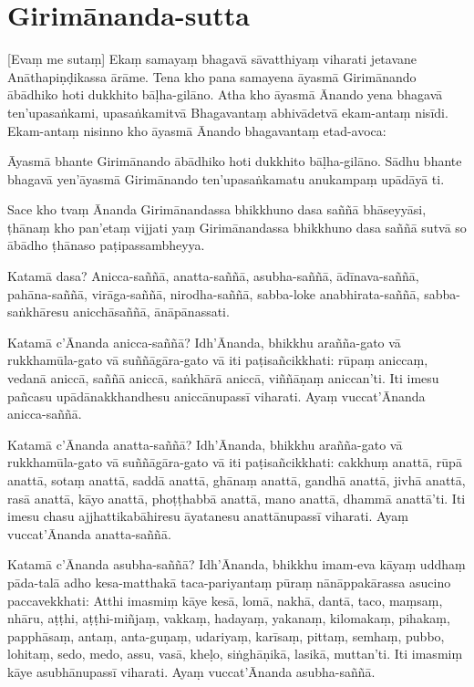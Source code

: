 \section{Girimānanda-sutta}

[Evaṃ me sutaṃ] 
Ekaṃ samayaṃ bhagavā sāvatthiyaṃ viharati jetavane
Anāthapiṇḍikassa ārāme. Tena kho pana samayena āyasmā Girimānando ābādhiko hoti
dukkhito bāḷha-gilāno. Atha kho āyasmā Ānando yena bhagavā ten’upasaṅkami,
upasaṅkamitvā Bhagavantaṃ abhivādetvā ekam-antaṃ nisīdi. Ekam-antaṃ nisinno kho
āyasmā Ānando bhagavantaṃ etad-avoca:

Āyasmā bhante Girimānando ābādhiko hoti dukkhito bāḷha-gilāno. Sādhu bhante
bhagavā yen’āyasmā Girimānando ten’upasaṅkamatu anukampaṃ upādāyā ti.

Sace kho tvaṃ Ānanda Girimānandassa bhikkhuno dasa saññā bhāseyyāsi, ṭhānaṃ kho
pan’etaṃ vijjati yaṃ Girimānandassa bhikkhuno dasa saññā sutvā so ābādho ṭhānaso
paṭipassambheyya.

Katamā dasa? Anicca-saññā, anatta-saññā, asubha-saññā, ādīnava-saññā,
pahāna-saññā, virāga-saññā, nirodha-saññā, sabba-loke anabhirata-saññā,
sabba-saṅkhāresu anicchāsaññā, ānāpānassati.

Katamā c’Ānanda anicca-saññā? Idh’Ānanda, bhikkhu arañña-gato vā
rukkhamūla-gato vā suññāgāra-gato vā iti paṭisañcikkhati: rūpaṃ aniccaṃ, vedanā
aniccā, saññā aniccā, saṅkhārā aniccā, viññāṇaṃ aniccan’ti. Iti imesu pañcasu
upādānakkhandhesu aniccānupassī viharati. Ayaṃ vuccat’Ānanda anicca-saññā.

Katamā c’Ānanda anatta-saññā? Idh’Ānanda, bhikkhu arañña-gato vā
rukkhamūla-gato vā suññāgāra-gato vā iti paṭisañcikkhati: cakkhuṃ anattā, rūpā
anattā, sotaṃ anattā, saddā anattā, ghānaṃ anattā, gandhā anattā, jivhā anattā,
rasā anattā, kāyo anattā, phoṭṭhabbā anattā, mano anattā, dhammā anattā’ti. Iti
imesu chasu ajjhattikabāhiresu āyatanesu anattānupassī viharati. Ayaṃ
vuccat’Ānanda anatta-saññā.

Katamā c’Ānanda asubha-saññā? Idh’Ānanda, bhikkhu imam-eva kāyaṃ uddhaṃ
pāda-talā adho kesa-matthakā taca-pariyantaṃ pūraṃ nānāppakārassa asucino
paccavekkhati: Atthi imasmiṃ kāye kesā, lomā, nakhā, dantā, taco, maṃsaṃ,
nhāru, aṭṭhi, aṭṭhi-miñjaṃ, vakkaṃ, hadayaṃ, yakanaṃ, kilomakaṃ, pihakaṃ,
papphāsaṃ, antaṃ, anta-guṇaṃ, udariyaṃ, karīsaṃ, pittaṃ, semhaṃ, pubbo, lohitaṃ,
sedo, medo, assu, vasā, kheḷo, siṅghāṇikā, lasikā, muttan’ti. Iti imasmiṃ kāye
asubhānupassī viharati. Ayaṃ vuccat’Ānanda asubha-saññā.

